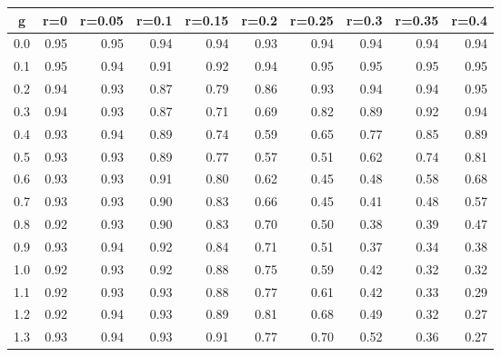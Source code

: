 %
\begin{table}[!tbp]
 \begin{center}
 \begin{tabular}{rrrrrrrrrr}\hline\hline
\multicolumn{1}{c}{g}&\multicolumn{1}{c}{r=0}&\multicolumn{1}{c}{r=0.05}&\multicolumn{1}{c}{r=0.1}&\multicolumn{1}{c}{r=0.15}&\multicolumn{1}{c}{r=0.2}&\multicolumn{1}{c}{r=0.25}&\multicolumn{1}{c}{r=0.3}&\multicolumn{1}{c}{r=0.35}&\multicolumn{1}{c}{r=0.4}\tabularnewline
\hline
0.0&0.95&0.95&0.94&0.94&0.93&0.94&0.94&0.94&0.94\tabularnewline
0.1&0.95&0.94&0.91&0.92&0.94&0.95&0.95&0.95&0.95\tabularnewline
0.2&0.94&0.93&0.87&0.79&0.86&0.93&0.94&0.94&0.95\tabularnewline
0.3&0.94&0.93&0.87&0.71&0.69&0.82&0.89&0.92&0.94\tabularnewline
0.4&0.93&0.94&0.89&0.74&0.59&0.65&0.77&0.85&0.89\tabularnewline
0.5&0.93&0.93&0.89&0.77&0.57&0.51&0.62&0.74&0.81\tabularnewline
0.6&0.93&0.93&0.91&0.80&0.62&0.45&0.48&0.58&0.68\tabularnewline
0.7&0.93&0.93&0.90&0.83&0.66&0.45&0.41&0.48&0.57\tabularnewline
0.8&0.92&0.93&0.90&0.83&0.70&0.50&0.38&0.39&0.47\tabularnewline
0.9&0.93&0.94&0.92&0.84&0.71&0.51&0.37&0.34&0.38\tabularnewline
1.0&0.92&0.93&0.92&0.88&0.75&0.59&0.42&0.32&0.32\tabularnewline
1.1&0.92&0.93&0.93&0.88&0.77&0.61&0.42&0.33&0.29\tabularnewline
1.2&0.92&0.94&0.93&0.89&0.81&0.68&0.49&0.32&0.27\tabularnewline
1.3&0.93&0.94&0.93&0.91&0.77&0.70&0.52&0.36&0.27\tabularnewline
\hline
\end{tabular}

\end{center}

\end{table}

